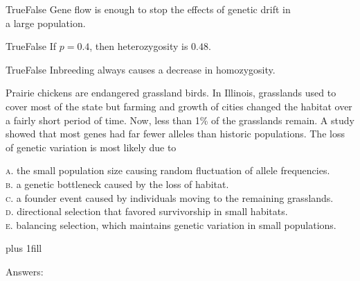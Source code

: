 \documentclass[letterpaper]{tufte-handout}
\begin{document}
\bigskip

\noindent True\hspace{1em}False\hspace{1em} Gene flow is enough to stop the effects of genetic drift in  \\
\noindent {}  a large population.

\bigskip

\noindent True\hspace{1em}False\hspace{1em} If $p=0.4$, then heterozygosity is $0.48$.

\bigskip

\noindent True\hspace{1em}False\hspace{1em} Inbreeding always causes a
decrease in homozygosity.

\bigskip
\noindent Prairie chickens are endangered grassland birds. In Illinois, 
grasslands used to cover most of the state but farming and growth of 
cities changed the habitat over a fairly short period of time. Now, 
less than 1\% of the grasslands remain. A study showed that most genes 
had far fewer alleles than historic populations. The loss of genetic 
variation is most likely due to

\smallskip

\noindent \textsc{a}. the small population size causing random fluctuation of allele frequencies.\\
\noindent \textsc{b}. a genetic bottleneck caused by the loss of habitat. \\
\noindent \textsc{c}. a founder event caused by individuals moving to the remaining grasslands. \\
\noindent \textsc{d}. directional selection that favored survivorship in small habitats. \\
\noindent \textsc{e}. balancing selection, which maintains genetic variation in small populations.

\vskip0pt plus 1fill

\hfill Answers: 
\end{document}
